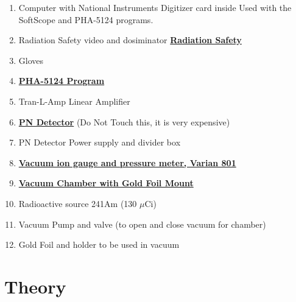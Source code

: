 \documentclass{../lab}
\begin{document}
\begin{enumerate}
    \item Computer with National Instruments Digitizer card inside Used with the SoftScope and PHA-5124 programs.

    \item Radiation Safety video and dosiminator \href{http://experimentationlab.berkeley.edu/RadiationSafety}{\textbf{Radiation Safety}}

    \item Gloves

    \item \href{http://experimentationlab.berkeley.edu/PHA-5124Program}{\textbf{PHA-5124 Program}}

    \item Tran-L-Amp Linear Amplifier

    \item \href{http://physics111.lib.berkeley.edu/Physics111/Reprints/RUT/RUT\_Detector\_018.JPG}{\textbf{PN Detector}} (Do Not Touch this, it is very expensive)

    \item PN Detector Power supply and divider box

    \item \href{http://physics111.lib.berkeley.edu/Physics111/Reprints/RUT/Thermo\_Couple\_ionGauge.pdf}{\textbf{Vacuum ion gauge and pressure meter, Varian 801}}

    \item \href{http://physics111.lib.berkeley.edu/Physics111/Reprints/RUT/RUT\_Chamber\_017.JPG}{\textbf{Vacuum Chamber with Gold Foil Mount}}

    \item Radioactive source 241Am (130 $\mu$Ci)

    \item Vacuum Pump and valve (to open and close vacuum for chamber)

    \item Gold Foil and holder to be used in vacuum

\end{enumerate}

\section{Theory}
\end{document}
